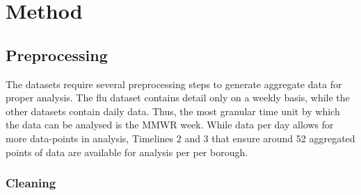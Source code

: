 \documentclass[11pt]{article}
\begin{document}




\section{Method}

\subsection{Preprocessing}

The datasets require several preprocessing steps to generate aggregate data for proper analysis.
The flu dataset contains detail only on a weekly basis, 
while the other datasets contain daily data. 
Thus, the most granular time unit by which the data can be analysed is the MMWR week.
While data per day allows for more data-points in analysis,
Timelines 2 and 3 that ensure around 52 aggregated points of data are available for analysis per per borough.

\subsubsection{Cleaning}
\end{document}
